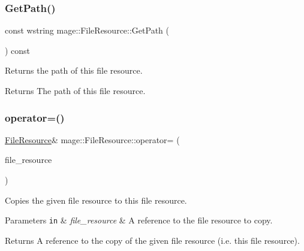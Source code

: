 \subsubsection{\texorpdfstring{Get\+Path()}{GetPath()}}
{\footnotesize\ttfamily const wstring mage\+::\+File\+Resource\+::\+Get\+Path (\begin{DoxyParamCaption}{ }\end{DoxyParamCaption}) const\hspace{0.3cm}{\ttfamily [noexcept]}}

Returns the path of this file resource.

\begin{DoxyReturn}{Returns}
The path of this file resource. 
\end{DoxyReturn}
\hypertarget{classmage_1_1_file_resource_a195da42fa3a40991e7c38cf8305b0bf2}{}\label{classmage_1_1_file_resource_a195da42fa3a40991e7c38cf8305b0bf2} 
\subsubsection{\texorpdfstring{operator=()}{operator=()}\hspace{0.1cm}{\footnotesize\ttfamily [1/2]}}
{\footnotesize\ttfamily \hyperlink{classmage_1_1_file_resource}{File\+Resource}\& mage\+::\+File\+Resource\+::operator= (\begin{DoxyParamCaption}\item[{const \hyperlink{classmage_1_1_file_resource}{File\+Resource} \&}]{file\+\_\+resource }\end{DoxyParamCaption})\hspace{0.3cm}{\ttfamily [delete]}}

Copies the given file resource to this file resource.


\begin{DoxyParams}[1]{Parameters}
\mbox{\tt in}  & {\em file\+\_\+resource} & A reference to the file resource to copy. \\
\hline
\end{DoxyParams}
\begin{DoxyReturn}{Returns}
A reference to the copy of the given file resource (i.\+e. this file resource). 
\end{DoxyReturn}
\hypertarget{classmage_1_1_file_resource_a7ec207d6e9cb0bc4b8020aa73df986b6}{}\label{classmage_1_1_file_resource_a7ec207d6e9cb0bc4b8020aa73df986b6} 
